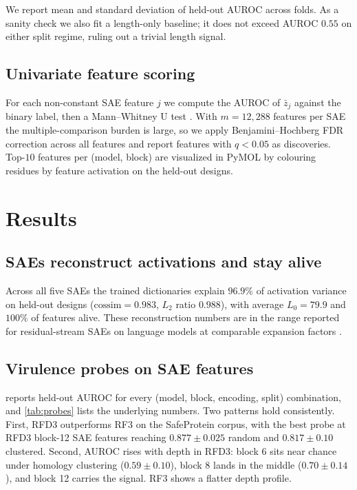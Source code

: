 \documentclass{article}
\theoremstyle{plain}
\theoremstyle{definition}
\theoremstyle{remark}
\begin{document}
We report mean and standard deviation of held-out AUROC across folds. As a sanity check we also fit a length-only baseline; it does not exceed AUROC $0.55$ on either split regime, ruling out a trivial length signal.

\subsection{Univariate feature scoring}

For each non-constant SAE feature $j$ we compute the AUROC of $\bar{z}_j$ against the binary label, then a Mann--Whitney U test \cite{mann1947whitney}. With $m = 12{,}288$ features per SAE the multiple-comparison burden is large, so we apply Benjamini--Hochberg FDR correction \cite{benjamini1995controlling} across all features and report features with $q < 0.05$ as discoveries. Top-$10$ features per (model, block) are visualized in PyMOL by colouring residues by feature activation on the held-out designs.

\section{Results}
\label{sec:results}

\subsection{SAEs reconstruct activations and stay alive}

Across all five SAEs the trained dictionaries explain $96.9\%$ of activation variance on held-out designs ($\mathrm{cossim} = 0.983$, $L_2$ ratio $0.988$), with average $L_0 = 79.9$ and $100\%$ of features alive. These reconstruction numbers are in the range reported for residual-stream SAEs on language models at comparable expansion factors \cite{gao2025scaling,bussmann2025matryoshka}.

\subsection{Virulence probes on SAE features}

 reports held-out AUROC for every (model, block, encoding, split) combination, and \cref{tab:probes} lists the underlying numbers. Two patterns hold consistently. First, RFD3 outperforms RF3 on the SafeProtein corpus, with the best probe at RFD3 block-12 SAE features reaching $0.877 \pm 0.025$ random and $0.817 \pm 0.10$ clustered. Second, AUROC rises with depth in RFD3: block 6 sits near chance under homology clustering ($0.59 \pm 0.10$), block 8 lands in the middle ($0.70 \pm 0.14$), and block 12 carries the signal. RF3 shows a flatter depth profile.
\end{document}
